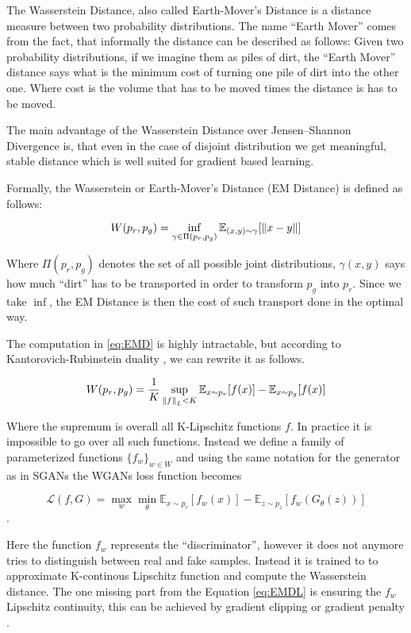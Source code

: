 The Wasserstein Distance, also called Earth-Mover's Distance is a distance
measure between two probability distributions. The name ``Earth Mover'' comes
from the fact, that informally the distance can be described as follows: Given
two probability distributions, if we imagine them as piles of dirt, the ``Earth
Mover'' distance says what is the minimum cost of turning one pile of dirt into the
other one. Where cost is the volume that has to be moved times the distance is
has to be moved.

The main advantage of the Wasserstein Distance over Jensen–Shannon Divergence is,
that even in the case of disjoint distribution we get meaningful, stable
distance which is well suited for gradient based learning.

Formally, the Wasserstein or Earth-Mover's Distance (EM Distance) is defined as
follows:

\begin{equation}
  \label{eq:EMD}
  W(p_r, p_g) = \inf_{\gamma \in \Pi(p_r, p_g)} \mathbb{E}_{(x, y) \sim \gamma}[\left\lVert x-y\right\rVert]
\end{equation}

Where $\Pi(p_r, p_g)$ denotes the set of all possible joint distributions,
$\gamma(x,y)$ says how much ``dirt'' has to be transported in order to transform
$p_g$ into $p_r$. Since we take $\inf$, the EM Distance is then the cost of such
transport done in the optimal way. 

The computation in \ref{eq:EMD} is highly intractable, but according to
Kantorovich-Rubinstein duality \cite{villani@optimal}, we can rewrite it as
follows.

\begin{equation}
  \label{eq:EMD2}
  W(p_r, p_g) = \frac{1}{K} \sup_{\left\lVert f\right\rVert_L < K} \mathbb{E}_{x \sim p_r}[f(x)] - \mathbb{E}_{x \sim p_g}[f(x)]
\end{equation}

Where the supremum is overall all K-Lipschitz functions $f$. In practice it is
impossible to go over all such functions. Instead we define a family of parameterized
functions $\{f_{w}\}_{w \in W}$ and using the same notation for the generator as
in SGANs the WGANs loss function becomes


\begin{equation}
  \label{eq:EMDL}
  \mathcal{L}(f, G) = \max_{w}\min_{\theta}  \mathbb{E}_{x \sim p_r}[f_w(x)] - \mathbb{E}_{z \sim p_z}[f_w(G_{\theta}(z))]
\end{equation}.

Here the function $f_w$ represents the ``discriminator'', however it does not
anymore tries to distinguish between real and fake samples. Instead it is
trained to to approximate K-continous Lipschitz function and compute the
Wasserstein distance. The one missing part from the Equation \ref{eq:EMDL} is
ensuring the $f_w$ Lipschitz continuity, this can be achieved by gradient
clipping \cite{arjovsky2017wasserstein} or gradient penalty \cite{gulrajani2017improved}.

